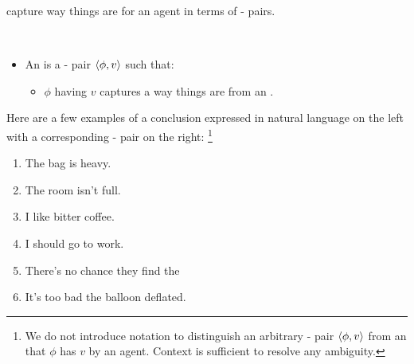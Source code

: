 \begin{note}
   capture way things are for an agent in terms of - pairs.

    \begin{definition}[\evalN{3}]
      \label{def:evals}
      \mbox{ }
      \vspace{-\baselineskip}
      \begin{itemize}
      \item
        An \emph{\evalN{}} is a - pair \(\langle\phi, v\rangle\) such that:
        \begin{itemize}
        \item
          \(\phi\) having  \(v\) captures a way things are from an \agpe{}.
        \end{itemize}
      \end{itemize}
      \vspace{-\baselineskip}
    \end{definition}

    \noindent%
    Here are a few examples of a conclusion expressed in natural language on the left with a corresponding - pair on the right:%
    \footnote{
      We do not introduce notation to distinguish an arbitrary - pair \(\langle\phi, v\rangle\) from an \eval{} that \(\phi\) has  \(v\) by an agent.
      Context is sufficient to resolve any ambiguity.
    }

    \begin{enumerate}[label=\arabic*., ref=(\arabic*),noitemsep, series=propValExC]
    \item
      The bag is heavy.%
      \hfill%
    \item
      The room isn't full.%
      \hfill%
    \item
      \label{pvEx:bC}
      I like bitter coffee.%
      \hfill%
    \item
      I should go to work.%
      \hfill%
    \item
      There's no chance they find the%
      \hfill%
    \item
      It's too bad the balloon deflated.%
      \hfill%
    \end{enumerate}


\end{note}
